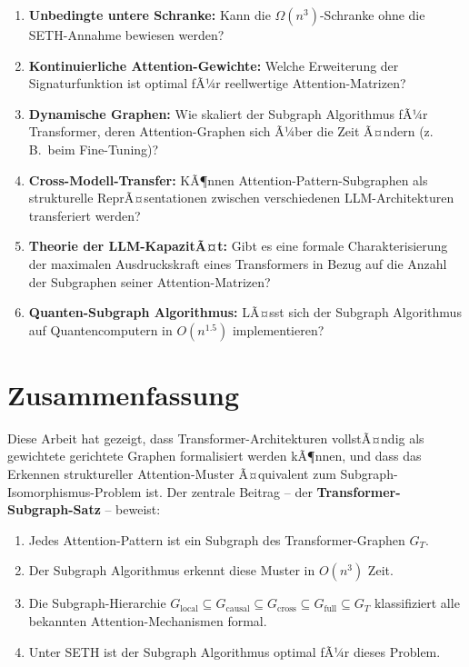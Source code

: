 ﻿\documentclass[a4paper,12pt]{article}
\theoremstyle{definition}
\begin{document}
\begin{enumerate}
	\item \textbf{Unbedingte untere Schranke:} Kann die $\Omega(n^3)$-Schranke
	ohne die SETH-Annahme bewiesen werden?

	\item \textbf{Kontinuierliche Attention-Gewichte:} Welche Erweiterung
	der Signaturfunktion ist optimal fÃ¼r reellwertige Attention-Matrizen?

	\item \textbf{Dynamische Graphen:} Wie skaliert der Subgraph Algorithmus
	fÃ¼r Transformer, deren Attention-Graphen sich Ã¼ber die Zeit Ã¤ndern
	(z.\,B.\ beim Fine-Tuning)?

	\item \textbf{Cross-Modell-Transfer:} KÃ¶nnen Attention-Pattern-Subgraphen
	als strukturelle ReprÃ¤sentationen zwischen verschiedenen LLM-Architekturen
	transferiert werden?

	\item \textbf{Theorie der LLM-KapazitÃ¤t:} Gibt es eine formale
	Charakterisierung der maximalen Ausdruckskraft eines Transformers
	in Bezug auf die Anzahl der Subgraphen seiner Attention-Matrizen?

	\item \textbf{Quanten-Subgraph Algorithmus:} LÃ¤sst sich der Subgraph
	Algorithmus auf Quantencomputern in $O(n^{1.5})$ implementieren?
\end{enumerate}

\section{Zusammenfassung}

Diese Arbeit hat gezeigt, dass Transformer-Architekturen vollstÃ¤ndig als
gewichtete gerichtete Graphen formalisiert werden kÃ¶nnen, und dass das
Erkennen struktureller Attention-Muster Ã¤quivalent zum Subgraph-Isomorphismus-Problem
ist. Der zentrale Beitrag -- der \textbf{Transformer-Subgraph-Satz} --
beweist:

\begin{enumerate}
	\item Jedes Attention-Pattern ist ein Subgraph des Transformer-Graphen $G_T$.
	\item Der Subgraph Algorithmus erkennt diese Muster in $O(n^3)$ Zeit.
	\item Die Subgraph-Hierarchie
	$G_{\mathrm{local}} \subseteq G_{\mathrm{causal}} \subseteq G_{\mathrm{cross}} \subseteq G_{\mathrm{full}} \subseteq G_T$
	klassifiziert alle bekannten Attention-Mechanismen formal.
	\item Unter SETH ist der Subgraph Algorithmus optimal fÃ¼r dieses Problem.
\end{enumerate}
\end{document}
